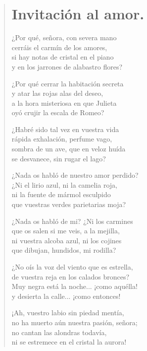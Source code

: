 \documentclass[12pt, twoside]{book}
\begin{document}
\newpage
\begin{verse}
\begin{center}
\section{Invitación al amor.}
\end{center}
¿Por qué, señora, con severa mano\\
cerráis el carmín de los amores,\\
si hay notas de cristal en el piano\\
y en los jarrones de alabastro flores?
\newline

¿Por qué cerrar la habitación secreta\\
y atar las rojas alas del deseo,\\
a la hora misteriosa en que Julieta\\
oyó crujir la escala de Romeo?
\newline

¿Habré sido tal vez en vuestra vida\\
rápida exhalación, perfume vago,\\
sombra de un ave, que en veloz huída\\
se desvanece, sin rugar el lago?
\newline

¿Nada os habló de nuestro amor perdido?\\
¿Ni el lirio azul, ni la camelia roja,\\
ni la fuente de mármol esculpido\\
que vuestras verdes parietarias moja?
\newline

¿Nada os habló de mi? ¿Ni los carmines\\
que os salen si me veis, a la mejilla,\\
ni vuestra alcoba azul, ni los cojines\\
que dibujan, hundidos, mi rodilla? 
\newline

¿No oís la voz del viento que es estrella,\\
de vuestra reja en los calados bronces?\\
Muy negra está la noche... ¡como aquélla!\\
y desierta la calle... ¡como entonces!
\newpage

¡Ah, vuestro labio sin piedad mentía,\\
no ha muerto aún nuestra pasión, señora;\\
no cantan las alondras todavía,\\
ni se estremece en el cristal la aurora!
\newline


\end{verse}
\end{document}
